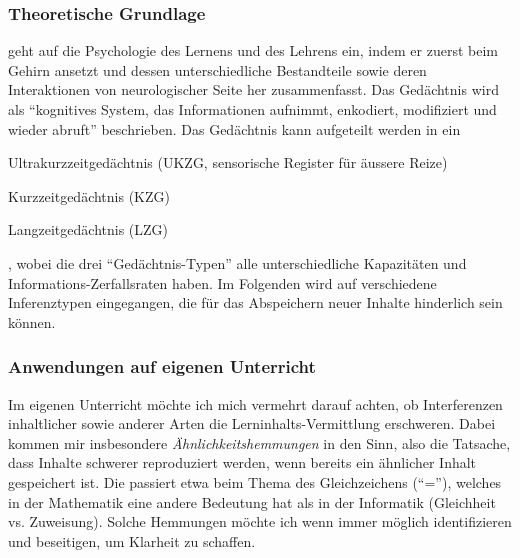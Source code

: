 \begin{myExBox}[title=Interferenzen vermeiden]
\subsubsection*{Theoretische Grundlage}
\textcite{alma99116996690305511} geht auf die Psychologie des Lernens und des Lehrens ein, indem er zuerst beim Gehirn ansetzt und dessen unterschiedliche Bestandteile sowie deren Interaktionen von neurologischer Seite her zusammenfasst. Das Gedächtnis wird als \enquote{kognitives System, das Informationen aufnimmt, enkodiert, modifiziert und wieder abruft} beschrieben. Das Gedächtnis kann aufgeteilt werden in ein \begin{enumerate*}
\item Ultrakurzzeitgedächtnis (UKZG, sensorische Register für äussere Reize)
\item Kurzzeitgedächtnis (KZG)
\item Langzeitgedächtnis (LZG)
\end{enumerate*}, wobei die drei \enquote{Gedächtnis-Typen} alle unterschiedliche Kapazitäten und Informations-Zerfallsraten haben. Im Folgenden wird auf verschiedene Inferenztypen eingegangen, die für das Abspeichern neuer Inhalte hinderlich sein können.
\subsubsection*{Anwendungen auf eigenen Unterricht}
Im eigenen Unterricht möchte ich mich vermehrt darauf achten, ob Interferenzen inhaltlicher sowie anderer Arten die Lerninhalts-Vermittlung erschweren. Dabei kommen mir insbesondere \textit{Ähnlichkeitshemmungen} in den Sinn, also die Tatsache, dass Inhalte schwerer reproduziert werden, wenn bereits ein ähnlicher Inhalt gespeichert ist. Die passiert etwa beim Thema des Gleichzeichens (\enquote{=}), welches in der Mathematik eine andere Bedeutung hat als in der Informatik (Gleichheit vs. Zuweisung). Solche Hemmungen möchte ich wenn immer möglich identifizieren und beseitigen, um Klarheit zu schaffen.
\end{myExBox}


